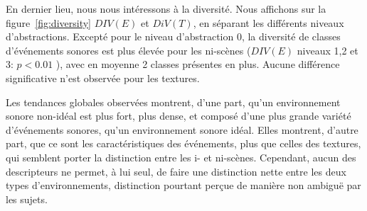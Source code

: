 En dernier lieu, nous nous intéressons à la diversité. Nous affichons sur la figure~\ref{fig:diversity} $DIV(E)$ et $DiV(T)$, en séparant les différents niveaux d'abstractions. Excepté pour le niveau d'abstraction 0, la diversité de classes d'événements sonores est plus élevée pour les ni-scènes ($DIV(E)$ niveaux 1,2 et 3: $p<0.01$ ), avec en moyenne 2 classes présentes en plus. Aucune différence significative n'est observée pour les textures.

Les tendances globales observées montrent, d'une part, qu'un environnement sonore non-idéal est plus fort, plus dense, et composé d'une plus grande variété d'événements sonores, qu'un environnement sonore idéal. Elles montrent, d'autre part, que ce sont les caractéristiques des événements, plus que celles des textures, qui semblent porter la distinction entre les i- et ni-scènes. Cependant, aucun des descripteurs ne permet, à lui seul, de faire une distinction nette entre les deux types d'environnements, distinction pourtant perçue de manière non ambiguë par les sujets.

